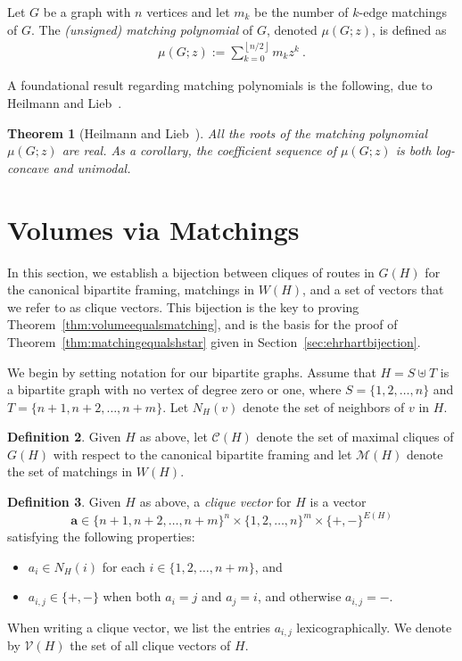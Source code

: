 \documentclass[12pt]{amsart}
\newtheorem{theorem}{Theorem}[section]
\theoremstyle{definition}
\newtheorem{definition}[theorem]{Definition}
\newcommand\ba{\mathbf{a}}
\newcommand\calM{\mathcal{M}}
\newcommand{\cliques}{\mathcal{C}}
\newcommand{\cliquevs}{\mathcal{V}}
\newcommand{\floor}[1]{\left\lfloor#1\right\rfloor}
\begin{document}
Let $G$ be a graph with $n$ vertices and let $m_k$ be the number of $k$-edge matchings of $G$. 
The \emph{(unsigned) matching polynomial} of $G$, denoted $\mu(G;z)$, is defined as
\begin{align*}
    \mu(G;z) := \sum_{k=0}^{\floor{n/2}} m_k z^k\ .
\end{align*}

A foundational result regarding matching polynomials is the following, due to Heilmann and Lieb~\cite{heilmannlieb,stanleylogconcave}.

\begin{theorem}[Heilmann and Lieb~\cite{heilmannlieb}]
\label{thm:matchingpolyrealrooted}
    All the roots of the matching polynomial $\mu(G;z)$ are  real.
    As a corollary, the coefficient sequence of $\mu(G;z)$ is both log-concave and unimodal.
\end{theorem}



\section{Volumes via Matchings}\label{sec:volumebijection}

In this section, we establish a bijection between cliques of routes in $G(H)$ for the canonical bipartite framing, matchings in $W(H)$, and a set of vectors that we refer to as clique vectors.
This bijection is the key to proving Theorem~\ref{thm:volumeequalsmatching}, and is the basis for the proof of Theorem~\ref{thm:matchingequalshstar} given in Section~\ref{sec:ehrhartbijection}.

We begin by setting notation for our bipartite graphs.
Assume that $H=S\uplus T$ is a bipartite graph with no vertex of degree zero or one, where $S=\{1,2,\ldots,n\}$ and $T=\{n+1,n+2,\ldots,n+m\}$.
Let $N_H(v)$ denote the set of neighbors of $v$ in $H$.

\begin{definition}
    Given $H$ as above, let $\cliques(H)$ denote the set of maximal cliques of $G(H)$ with respect to the canonical bipartite framing and let $\calM(H)$ denote the set of matchings in $W(H)$.
\end{definition}

\begin{definition}\label{def:cliquevector}
Given $H$ as above, a \emph{clique vector} for $H$ is a vector 
\[
\ba\in \{n+1,n+2,\ldots,n+m\}^{n}\times \{1,2,\ldots,n\}^{m}\times \{+,-\}^{E(H)}
\]
satisfying the following properties:
\begin{itemize}
    \item $a_i\in N_H(i)$ for each $i\in \{1,2,\ldots,n+m\}$, and
    \item $a_{i,j} \in \{+,-\}$ when both $a_i=j$ and $a_j=i$, and otherwise $a_{i,j} = -$.
\end{itemize}
When writing a clique vector, we list the entries $a_{i,j}$ lexicographically.
We denote by $\cliquevs(H)$ the set of all clique vectors of $H$.
\end{definition}
\end{document}
